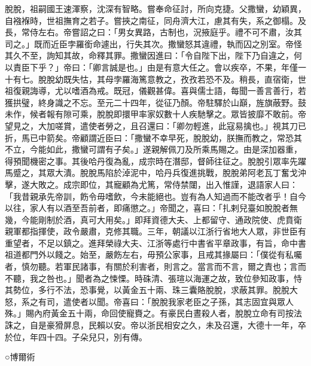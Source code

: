 \begin{pinyinscope}
 脫脫，祖嗣國王速渾察，沈深有智略。嘗奉命征討，所向克捷。父撒蠻，幼穎異，自襁褓時，世祖撫育之若子。嘗挾之南征，同舟濟大江，慮其有失，系之御榻。及長，常侍左右。帝嘗詔之曰：「男女異路，古制也，況掖庭乎。禮不可不肅，汝其司之。」既而近臣孛羅銜命遽出，行失其次。撒蠻怒其違禮，執而囚之別室。帝怪其久不至，詢知其故，命釋其罪。撒蠻因進曰：「令自陛下出，陛下乃自違之，何以責臣下乎？」帝曰：「卿言誠是也。」由是有意大任之。會以疾卒，不果，年僅一十有七。脫脫幼既失怙，其母孛羅海篤意教之，孜孜若恐不及。稍長，直宿衛，世祖復親誨導，尤以嗜酒為戒。既冠，儀觀甚偉。喜與儒士語，每聞一善言善行，若獲拱璧，終身識之不忘。至元二十四年，從征乃顏。帝駐驛於山巔，旌旗蔽野。鼓未作，候者報有隙可乘，脫脫即擐甲率家奴數十人疾馳擊之。眾皆披靡不敢前。帝望見之，大加嗟賞，遣使者勞之，且召還曰：「卿勿輕進，此寇易擒也。」視其刀已折，馬已中箭矣。帝顧謂近臣曰：「撒蠻不幸早死，脫脫幼，朕撫而教之，常恐其不立，今能如此，撒蠻可謂有子矣。」遂親解佩刀及所乘馬賜之。由是深加器重，得預聞機密之事。其後哈丹復為亂，成宗時在潛邸，督師往征之。脫脫引眾率先躍馬蹙之，其眾大潰。脫脫馬陷於淖泥中，哈丹兵復進挑戰，脫脫弟阿老瓦丁奮戈沖擊，遂大敗之。成宗即位，其寵顧為尤篤，常侍禁闥，出入惟謹，退語家人曰：「我昔親承先帝訓，飭令毋嗜飲，今未能絕也。豈有為人知過而不能改者乎！自今以往，家人有以酒至吾前者，即痛懲之。」帝聞之，喜曰：「扎剌兒臺如脫脫者無幾，今能剛制於酒，真可大用矣。」即拜資德大夫、上都留守、通政院使、虎賁衛親軍都指揮使，政令嚴肅，克修其職。三年，朝議以江浙行省地大人眾，非世臣有重望者，不足以鎮之。進拜榮祿大夫、江浙等處行中書省平章政事，有旨，命中書祖道都門外以餞之。始至，嚴飭左右，毋預公家事，且戒其掾屬曰：「僕從有私囑者，慎勿聽。若軍民諸事，有關於利害者，則言之。當言而不言，爾之責也；言而不聽，我之咎也。」聞者為之悚慄。時硃清、張瑄以海運之故，致位參知政事，恃其勢位，多行不法，恐事覺，以黃金五十兩、珠三囊賂脫脫，求蔽其罪。脫脫大怒，系之有司，遣使者以聞。帝喜曰：「脫脫我家老臣之子孫，其志固宜與眾人殊。」賜內府黃金五十兩，命回使寵賚之。有豪民白晝殺人者，脫脫立命有司按法誅之，自是豪猾屏息，民賴以安。帝以浙民相安之久，未及召還，大德十一年，卒於位，年四十四。子朵兒只，別有傳。



 ○博爾術




\end{pinyinscope}
